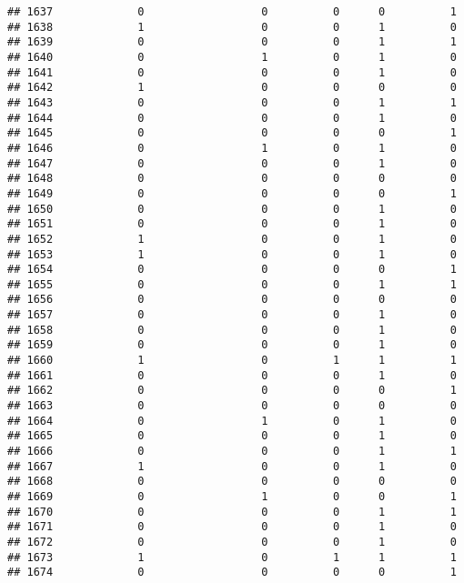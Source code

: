 \documentclass[
]{article}
\begin{document}
\begin{verbatim}
## 1637             0                  0          0      0          1
## 1638             1                  0          0      1          0
## 1639             0                  0          0      1          1
## 1640             0                  1          0      1          0
## 1641             0                  0          0      1          0
## 1642             1                  0          0      0          0
## 1643             0                  0          0      1          1
## 1644             0                  0          0      1          0
## 1645             0                  0          0      0          1
## 1646             0                  1          0      1          0
## 1647             0                  0          0      1          0
## 1648             0                  0          0      0          0
## 1649             0                  0          0      0          1
## 1650             0                  0          0      1          0
## 1651             0                  0          0      1          0
## 1652             1                  0          0      1          0
## 1653             1                  0          0      1          0
## 1654             0                  0          0      0          1
## 1655             0                  0          0      1          1
## 1656             0                  0          0      0          0
## 1657             0                  0          0      1          0
## 1658             0                  0          0      1          0
## 1659             0                  0          0      1          0
## 1660             1                  0          1      1          1
## 1661             0                  0          0      1          0
## 1662             0                  0          0      0          1
## 1663             0                  0          0      0          0
## 1664             0                  1          0      1          0
## 1665             0                  0          0      1          0
## 1666             0                  0          0      1          1
## 1667             1                  0          0      1          0
## 1668             0                  0          0      0          0
## 1669             0                  1          0      0          1
## 1670             0                  0          0      1          1
## 1671             0                  0          0      1          0
## 1672             0                  0          0      1          0
## 1673             1                  0          1      1          1
## 1674             0                  0          0      0          1

\end{verbatim}
\end{document}
